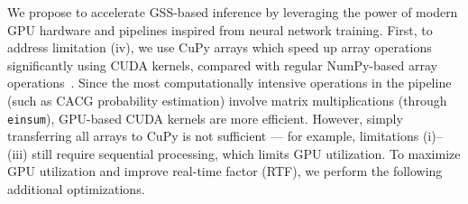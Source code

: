 \documentclass[a4paper]{article}
\begin{document}
We propose to accelerate GSS-based inference by leveraging the power of modern GPU hardware and pipelines inspired from neural network training. First, to address limitation (iv), we use CuPy arrays which speed up array operations significantly using CUDA kernels, compared with regular NumPy-based array operations~\cite{cupy_learningsys2017}. Since the most computationally intensive operations in the pipeline (such as CACG probability estimation) involve matrix multiplications (through \texttt{einsum}), GPU-based CUDA kernels are more efficient. However, simply transferring all arrays to CuPy is not sufficient --- for example, limitations (i)--(iii) still require sequential processing, which limits GPU utilization. To maximize GPU utilization and improve real-time factor (RTF), we perform the following additional optimizations.
\end{document}
